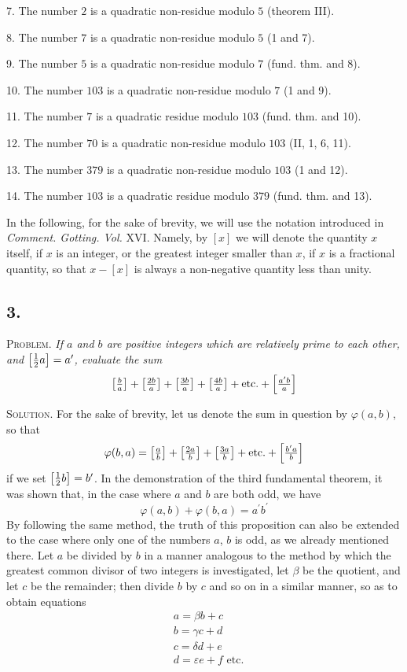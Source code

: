 \documentclass[twoside,12pt]{memoir}
\let\oldfrac\frac
\def\frac#1#2{\mathchoice{\tfrac{#1}{#2}}{\oldfrac{#1}{#2}}{\genfrac{}{}{}{2}{#1}{#2\mathstrut}}{\genfrac{}{}{}{3}{#1}{#2\mathstrut}}}
\begin{document}
7. The number \(2\) is a quadratic non-residue modulo \(5\) (theorem III).
    
8. The number \(7\) is a quadratic non-residue modulo \(5\) (1 and 7).
    
9. The number \(5\) is a quadratic non-residue modulo \(7\) (fund{.} thm{.} and 8).
    
10. The number \(103\) is a quadratic non-residue modulo \(7\) (1 and 9).
    
11. The number \(7\) is a quadratic residue modulo \(103\) (fund{.} thm{.} and 10).
    
12. The number \(70\) is a quadratic non-residue modulo \(103\) (II, 1, 6, 11).
    
13. The number \(379\) is a quadratic non-residue modulo \(103\) (1 and 12).
    
14. The number \(103\) is a quadratic residue modulo \(379\) (fund{.} thm{.} and 13).
%

\(\)In the following, for the sake of brevity, we will use the notation introduced in \textit{Comment. Gotting. Vol.} XVI. Namely, by \([x]\) we will denote the quantity \(x\) itself, if \(x\) is an integer, or the greatest integer smaller than \(x\), if \(x\) is a fractional quantity, so that \(x-[x]\) is always a non-negative quantity less than unity.
%

\subsection*{3.}
 
\textsc{Problem.} \textit{If \(a\) and \(b\) are positive integers which are relatively prime to each other, and \(\left[\frac{1}{2} a\right]=a^{\prime}\), evaluate the sum}
\[\left[\frac{b}{a}\right]+\left[\frac{2 b}{a}\right]+\left[\frac{3 b}{a}\right]+\left[\frac{4 b}{a}\right]+\text{etc{.}}+\left[\frac{a^{\prime} b}{a}\right]\]
 
\textsc{Solution.} For the sake of brevity, let us denote the sum in question by \(\varphi(a, b)\), so that
\[\varphi(b, a)=\left[\frac{a}{b}\right]+\left[\frac{2 a}{b}\right]+\left[\frac{3 a}{b}\right]+\text{etc{.}}+\left[\frac{b^{\prime} a}{b}\right]\]
if we set \(\left[\frac{1}{2} b\right]=b^{\prime}\). In the demonstration of the third fundamental theorem, it was shown that, in the case where \(a\) and \(b\) are both odd, we have
\[\varphi(a, b)+\varphi(b, a)=a^{\prime} b^{\prime}\]
By following the same method, the truth of this proposition can also be extended to the case where only one of the numbers \(a\), \(b\) is odd, as we already mentioned there. Let \(a\) be divided by \(b\) in a manner analogous to the method by which the greatest common divisor of two integers is investigated, let \(\beta\) be the quotient, and let \(c\) be the remainder; then divide \(b\) by \(c\) and so on in a similar manner, so as to obtain equations
\[\begin{aligned}
& a=\beta b+c \\
& b=\gamma c+d \\
& c=\delta d+e \\
& d=\varepsilon e+f \text{ etc{.}}
\end{aligned}\]
 
\end{document}
